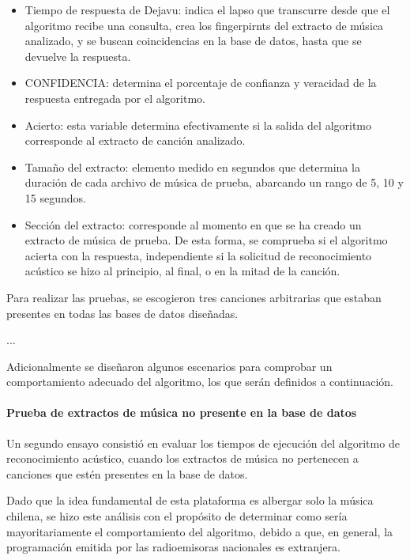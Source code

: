 \begin{itemize}
\item Tiempo de respuesta de Dejavu: indica el lapso que transcurre desde que el algoritmo recibe una consulta, crea los fingerpirnts del extracto de música analizado, y se buscan coincidencias en la base de datos, hasta que se devuelve la respuesta.

\item CONFIDENCIA: determina el porcentaje de confianza y veracidad de la respuesta entregada por el algoritmo.

\item Acierto: esta variable determina efectivamente si la salida del algoritmo corresponde al extracto de canción analizado.

\item Tamaño del extracto: elemento medido en segundos que determina la duración de cada archivo de música de prueba, abarcando un rango de 5, 10 y 15 segundos.

\item Sección del extracto: corresponde al momento en que se ha creado un extracto de música de prueba. De esta forma, se comprueba si el algoritmo acierta con la respuesta, independiente si la solicitud de reconocimiento acústico se hizo al principio, al final, o en la mitad de la canción. 
\end{itemize}

Para realizar las pruebas, se escogieron tres canciones arbitrarias que estaban presentes en todas las bases de datos diseñadas.

...

Adicionalmente se diseñaron algunos escenarios para comprobar un comportamiento adecuado del algoritmo, los que serán definidos a continuación.

\paragraph{Prueba de extractos de música no presente en la base de datos}

Un segundo ensayo consistió en evaluar los tiempos de ejecución del algoritmo de reconocimiento acústico, cuando los extractos de música no pertenecen a canciones que estén presentes en la base de datos.
 
Dado que la idea fundamental de esta plataforma es albergar solo la música chilena, se hizo este análisis con el propósito de determinar como sería mayoritariamente el comportamiento del algoritmo, debido a que, en general, la programación emitida por las radioemisoras nacionales es extranjera.

